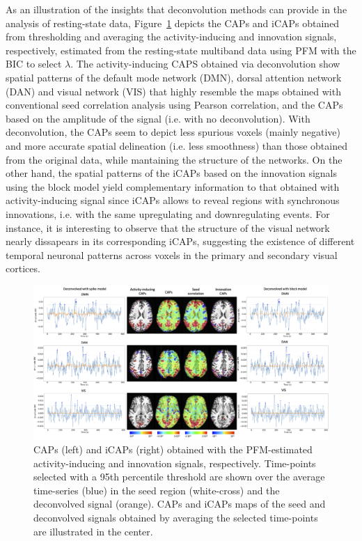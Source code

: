As an illustration of the insights that deconvolution methods can provide in the analysis of resting-state data, Figure~\ref{fig:caps} depicts the CAPs and iCAPs obtained from thresholding and averaging the activity-inducing and innovation signals, respectively, estimated from the resting-state multiband data using PFM with the BIC to select $\lambda$. The activity-inducing CAPS  obtained via deconvolution show spatial patterns of the default mode network (DMN), dorsal attention network (DAN) and visual network (VIS) that highly resemble the maps obtained with conventional seed correlation analysis using Pearson correlation, and the CAPs based on the amplitude of the signal (i.e. with no deconvolution). With deconvolution, the CAPs seem to depict less spurious voxels (mainly negative) and more accurate spatial delineation (i.e. less smoothness) than those obtained from the original data, while mantaining the structure of the networks. On the other hand, the spatial patterns of the iCAPs based on the innovation signals using the block model yield complementary information to that obtained with activity-inducing signal since iCAPs allows to reveal regions with synchronous innovations, i.e. with the same upregulating and downregulating events. For instance, it is interesting to observe that the structure of the visual network nearly dissapears in its corresponding iCAPs, suggesting the existence of different temporal neuronal patterns across voxels in the primary and secondary visual cortices. 

\begin{figure}[t!]
    \begin{center}
        \includegraphics[width=\textwidth]{figures/caps.png}
    \end{center}
    \caption{CAPs (left) and iCAPs (right) obtained with the PFM-estimated activity-inducing and innovation signals, respectively. Time-points selected with a 95th percentile threshold are shown over the average time-series (blue) in the seed region (white-cross) and the deconvolved signal (orange). CAPs and iCAPs maps of the seed and deconvolved signals obtained by averaging the selected time-points are illustrated in the center.}
\label{fig:caps}
\end{figure}

